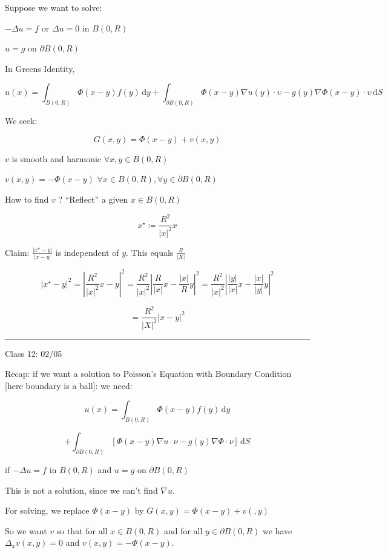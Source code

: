 \documentclass{article}
\theoremstyle{definition}
\begin{document}
Suppose we want to solve:

\(- \Delta u = f\) or \(\Delta u = 0\) in \(B(0,R)\) 

\(u = g\) on \(\partial B(0,R)\) 

In Greens Identity,

\[
    u(x) = \int_{B(0,R)}^{} \Phi(x-y) f(y) \,\mathrm{d}y + \int_{\partial B(0,R)}^{} \Phi(x-y)\nabla u(y)\cdot \upsilon - g(y)\nabla\Phi(x-y)\cdot \upsilon \,\mathrm{d}S 
\]

We seek:

\[
    G(x,y)=\Phi(x-y) + v(x,y)
\]

\(v\) is smooth and harmonic \(\forall x,y\in B(0,R)\) 

\(v(x,y)=-\Phi(x-y)\) \(\forall x\in B(0,R),\forall y\in \partial B(0,R)\) 

How to find \(v\) ? ``Reflect'' a given \(x\in B(0,R)\) 

\[
    x^{\star} \coloneqq \frac{R^2}{\vert x \vert ^2}x
\]

Claim: \(\frac{\vert x^{\star} - y \vert}{\vert x - y \vert }\) is independent of \(y\). This equals \(\frac{R}{\vert X \vert }\) 

\[
    \vert x^{\star} -y \vert ^2 = \left\vert \frac{R^2}{\vert x \vert ^2}x - y \right\vert ^2 = \frac{R^2}{\vert x \vert ^2} \left\vert \frac{R}{\vert x \vert }x - \frac{\vert x \vert }{R}y \right\vert^2 = \frac{R^2}{\vert x \vert ^2}\left\vert \frac{\vert y \vert }{\vert x \vert }x - \frac{\vert x \vert }{\vert y \vert}y \right\vert^2
\]

\[
    = \frac{R^2}{\vert X \vert ^2}\vert x-y \vert ^2
\]

\hfil
\hrule

Class 12: 02/05

Recap: if we want a solution to Poisson's Equation with Boundary Condition [here boundary is a ball]: we need:

\[
    u(x)=\int_{B(0,R)}^{} \Phi(x-y)f(y) \,\mathrm{d}y 
\]

\[
    + \int_{\partial B(0,R)}^{} \left[ \Phi(x-y)\nabla u\cdot\nu - g(y)\nabla\Phi\cdot\nu \right]  \,\mathrm{d}S 
\]

if \(-\Delta u = f\) in \(B(0,R)\) and \(u=g\) on \(\partial B(0,R)\) 

This is not a solution, since we can't find $\nabla u$.

For solving, we replace \(\Phi(x-y)\) by \(G(x,y)=\Phi(x-y)+v(,y)\) 

So we want \(v\) so that for all \(x\in B(0,R)\) and for all \(y\in \partial B(0,R)\) we have \(\Delta_x v(x,y)=0\) and \(v(x,y)=-\Phi(x-y)\).
\end{document}
